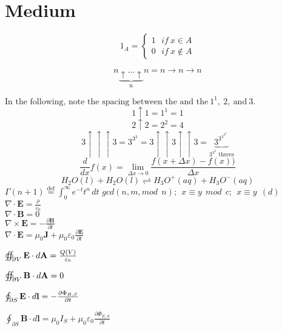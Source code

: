 \documentclass{article}
\begin{document}
\section*{Medium}

\[1_A=\left\{\begin{array}{l} 
1 \ \ \ if \ x \in A \\
0 \ \ \ if \ x \notin A
\end{array} \right.\]

\[n\underbrace{\uparrow...\uparrow}_\text{n}n = n\to n\to n\]

$\text{In the following, note the spacing between the and the}\ 1^{1},\ 2,\ \text{and}\ 3.
$\[1\uparrow 1 = 1^1 = 1\]
\[2\uparrow 2 = 2^2 = 4\]
\[3\uparrow\uparrow\uparrow3 = 3^{3^3} = 3\uparrow\uparrow3\uparrow\uparrow3=
\underbrace{3^{3^{3^{3^{3^{3^{.^{.^{.^3}}}}}}}}}_{3^{3^3}\text{ threes}}\]
\[\frac{d }{dx}f(x)=\lim_{\Delta x \to 0} \frac{f(x+\Delta x)-f(x))}{\Delta x}\]
\[H_2O(l)+H_2O(l)\rightleftharpoons H_3O^+(aq)+H_3O^-(aq)\]
$\Gamma(n+1)\stackrel{\text{def}}{=}\int_{0}^{\infty}e^{-t}t^{n}\,dt$
$gcd(n,m,mod\ \ n);\ \ x\equiv y\ \ mod\ \ c;\ \ x\equiv y\ \ (d)$
\\
$\nabla \cdot \textbf{E} = \frac{\rho}{\varepsilon_0}$
\\
$\nabla \cdot \textbf{B} = 0$
\\
$\nabla \times \textbf{E} = -\frac{\partial \textbf{B}}{\partial t}$
\\
$\nabla \cdot \textbf{E} = \mu_0\textbf{J} + \mu_0\varepsilon_0\frac{\partial \textbf{E}}{\partial t}$

$\oiint_{\partial V} \mathbf{E} \cdot d\mathbf{A}  = \frac{Q(V)}{\varepsilon_0} \\$

$\oiint_{\partial V} \mathbf{B} \cdot d\mathbf{A}  = 0 \\$

$\oint_{\partial S} \mathbf{E} \cdot d\mathbf{l}   = -\frac{\partial \Phi_{B,S}}{\partial t} \\$

$\oint_{\partial S} \mathbf{B} \cdot d\mathbf{l} = \mu_0 I_S + \mu_0 \varepsilon_0 \frac{\partial\Phi_{E,S}}{\partial t}$
\end{document}

